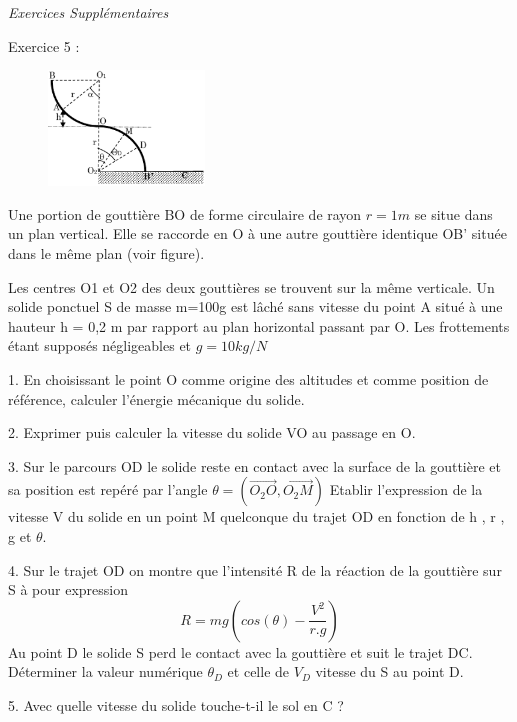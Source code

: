 \documentclass[12pt, french]{article}
\begin{document}
\vspace{2cm}
\begin{center}
   \Large{ \em{Exercices Supplémentaires}}
\end{center}



\begin{Box2}{Exercice 5 : }
\begin{figure}
  \begin{center}
    \includegraphics[width=0.37\textwidth]{./img/img04.png}
  \end{center}
\end{figure}
Une portion de gouttière BO de forme circulaire de rayon $r=1m$ se situe dans un plan
vertical. Elle se raccorde en O à une autre gouttière identique OB’ située dans le même plan (voir figure).

Les centres O1 et O2 des deux gouttières se trouvent sur la même verticale. Un solide ponctuel S de masse m=100g est lâché sans vitesse du point A situé à une hauteur h = 0,2 m par rapport au plan horizontal passant par O. Les frottements étant supposés négligeables et $g = 10kg/N$

1. En choisissant le point O comme origine des altitudes et comme position de référence, calculer l’énergie mécanique du solide.

2. Exprimer puis calculer la vitesse du solide VO au passage en O.

3. Sur le parcours OD le solide reste en contact avec la surface de la gouttière et sa position est repéré par l’angle $\theta = (\overrightarrow{O_2O}, \overrightarrow{O_2M})$
Etablir l’expression de la vitesse V du solide en un point M quelconque du trajet OD en fonction de h , r , g et $\theta$.

   4. Sur le trajet OD on montre que l’intensité R de la réaction de la gouttière sur S à pour expression $$R = mg(cos(\theta) - \frac{V^2}{r.g})$$
Au point D le solide S perd le contact avec la gouttière et suit le trajet DC. Déterminer la valeur numérique $\theta_D$ et celle de $V_D$ vitesse du S au point D.

   5. Avec quelle vitesse du solide touche-t-il le sol en C ?
\end{Box2}
\end{document}
